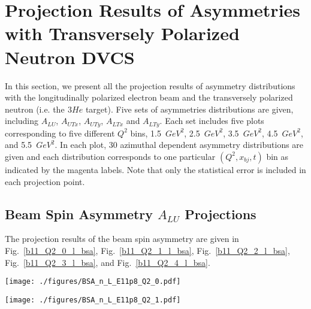 \appendix
\section{Projection Results of Asymmetries with Transversely Polarized Neutron DVCS}
In this section, we present all the projection results of asymmetry distributions with the longitudinally polarized electron beam and the transversely polarized neutron (i.e. the $\mathrm{^{}3}He$ target). Five sets of asymmetries distributions are given, including $A_{LU}$, $A_{UTx}$, $A_{UTy}$, $A_{LTx}$ and $A_{LTy}$. Each set includes five plots corresponding to five different $Q^{2}$ bins, 1.5~$GeV^{2}$, 2.5~$GeV^{2}$, 3.5~$GeV^{2}$, 4.5~$GeV^{2}$, and 5.5~$GeV^{2}$.  In each plot, 30 azimuthal dependent asymmetry distributions are given and each distribution corresponds to one particular $(Q^{2}, x_{bj}, t)$ bin as indicated by the magenta labels. Note that only the statistical error is included in each projection point.

\subsection{Beam Spin Asymmetry $A_{LU}$ Projections}
 The projection results of the beam spin asymmetry are given in Fig.~\ref{b11_Q2_0_l_bsa}, Fig.~\ref{b11_Q2_1_l_bsa}, Fig.~\ref{b11_Q2_2_l_bsa}, Fig.~\ref{b11_Q2_3_l_bsa}, and Fig.~\ref{b11_Q2_4_l_bsa}.

\begin{sidewaysfigure}[!ht]
 \begin{center}
  \texttt{[image: ./figures/BSA\_n\_L\_E11p8\_Q2\_0.pdf]}
  \caption{\footnotesize{Beam spin asymmetry ($A_{UL}$) distributions distribution at $Q^{2}\sim 1.5~GeV^{2}$ with $E_{beam}=8.8~GeV~and~11~GeV$}}
  \label{b11_Q2_0_l_bsa}
 \end{center}
\end{sidewaysfigure}

\begin{sidewaysfigure}[!ht]
 \begin{center}
  \texttt{[image: ./figures/BSA\_n\_L\_E11p8\_Q2\_1.pdf]}
  \caption{\footnotesize{Beam spin asymmetry ($A_{UL}$) distributions distribution at $Q^{2}\sim 2.5~GeV^{2}$ with $E_{beam}=8.8~GeV~and~11~GeV$}}
  \label{b11_Q2_1_l_bsa}
 \end{center}
\end{sidewaysfigure}

